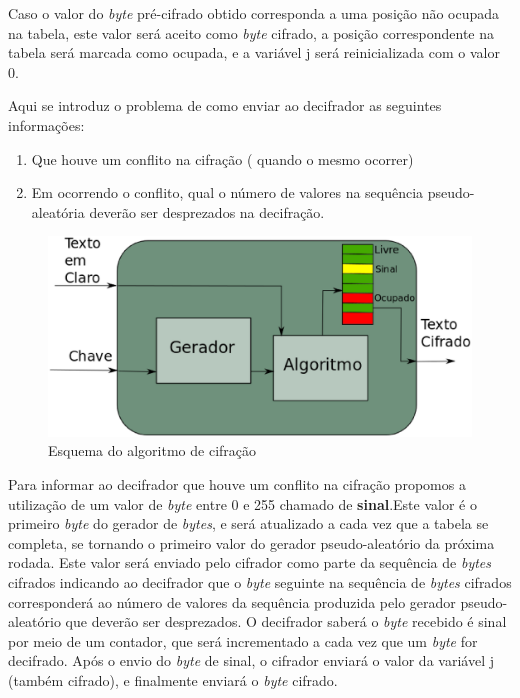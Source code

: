 Caso o valor do \textit{byte} pré-cifrado obtido corresponda a uma posição não ocupada na tabela, este valor será aceito como \textit{byte} cifrado, a posição correspondente na tabela será marcada como ocupada, e a variável j será reinicializada com o valor 0.

Aqui se introduz o problema de como enviar ao decifrador as seguintes informações:

\begin{enumerate}
	\item Que houve um conflito na cifração ( quando o mesmo ocorrer)
	\item Em ocorrendo o conflito, qual o número de valores na sequência pseudo-aleatória deverão ser desprezados na decifração.
\end{enumerate}


\begin{figure}[h]
	\centering
	\includegraphics[scale=0.4]{figuras/funcionamento.eps}
	\caption{Esquema do algoritmo de cifração}
\end{figure}

Para informar ao decifrador que houve um conflito na cifração propomos a utilização de um valor de \textit{byte} entre 0 e 255 chamado de \textbf{sinal}.Este valor é o primeiro \textit{byte} do gerador de \textit{bytes}, e será atualizado a cada vez que a tabela se completa, se tornando o primeiro valor do gerador pseudo-aleatório da próxima rodada. Este valor será enviado pelo cifrador como parte da sequência de \textit{bytes} cifrados indicando ao decifrador que o \textit{byte} seguinte na sequência de \textit{bytes} cifrados corresponderá ao número de valores da sequência produzida pelo gerador pseudo-aleatório que deverão ser desprezados. O decifrador saberá o \textit{byte} recebido é sinal por meio de um contador, que será incrementado a cada vez que um \textit{byte} for decifrado. Após o envio do \textit{byte} de sinal, o cifrador  enviará o valor da variável j (também cifrado), e finalmente enviará o \textit{byte} cifrado.


